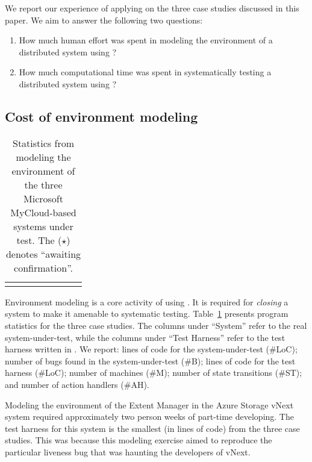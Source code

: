 We report our experience of applying \psharp on the three case studies discussed in this paper. We aim to answer the following two questions:

\begin{enumerate}
\item How much human effort was spent in modeling the environment of a distributed system using \psharp?

\item How much computational time was spent in systematically testing a distributed system using \psharp?
\end{enumerate}

\subsection{Cost of environment modeling}
\label{sec:eval:human_cost}

\newcommand{\colspacing}{\hspace{1.8em}}
\begin{table}[t]
\small
\centering
\setlength{\tabcolsep}{0.3em}
\begin{tabular}{l rrrrr rr}
\centering

\end{tabular}
\caption{Statistics from modeling the environment of the three Microsoft MyCloud-based systems under test. The ($\star$) denotes ``awaiting confirmation''.}
\label{tab:stats}
\vspace{-3mm}
\end{table}

Environment modeling is a core activity of using \psharp. It is required for \emph{closing} a system to make it amenable to systematic testing. Table~\ref{tab:stats} presents program statistics for the three case studies. The columns under ``System'' refer to the real system-under-test, while the columns under ``\psharp Test Harness'' refer to the test harness written in \psharp. We report: lines of code for the system-under-test (\#LoC); number of bugs found in the system-under-test (\#B); lines of \psharp code for the test harness (\#LoC); number of machines (\#M); number of state transitions (\#ST); and number of action handlers (\#AH).

Modeling the environment of the Extent Manager in the Azure Storage vNext system required approximately two person weeks of part-time developing. The \psharp test harness for this system is the smallest (in lines of code) from the three case studies. This was because this modeling exercise aimed to reproduce the particular liveness bug that was haunting the developers of vNext.

